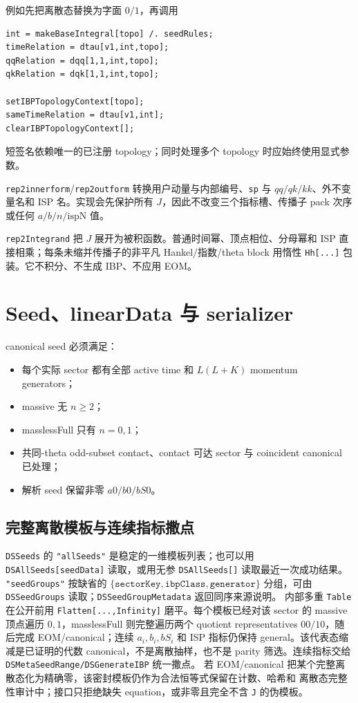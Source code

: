﻿\documentclass[a4paper,11pt]{article}
\begin{document}
例如先把离散态替换为字面 $0/1$，再调用
\begin{verbatim}
int = makeBaseIntegral[topo] /. seedRules;
timeRelation = dtau[v1,int,topo];
qqRelation = dqq[1,1,int,topo];
qkRelation = dqk[1,1,int,topo];

setIBPTopologyContext[topo];
sameTimeRelation = dtau[v1,int];
clearIBPTopologyContext[];
\end{verbatim}
短签名依赖唯一的已注册 topology；同时处理多个 topology 时应始终使用显式参数。

\texttt{rep2innerform}/\texttt{rep2outform} 转换用户动量与内部编号、\texttt{sp} 与 $qq/qk/kk$、外不变量名和 ISP 名。实现会先保护所有 $J$，因此不改变三个指标槽、传播子 pack 次序或任何 $a/b/n/\mathrm{ispN}$ 值。

\texttt{rep2Integrand} 把 $J$ 展开为被积函数。普通时间幂、顶点相位、分母幂和 ISP 直接相乘；每条未缩并传播子的非平凡 Hankel/指数/theta block 用惰性 \texttt{Hh[...]} 包装。它不积分、不生成 IBP、不应用 EOM。

\section{Seed、linearData 与 serializer}

canonical seed 必须满足：
\begin{itemize}
  \item 每个实际 sector 都有全部 active time 和 $L(L+K)$ momentum generators；
  \item massive 无 $n\ge2$；
  \item masslessFull 只有 $n=0,1$；
  \item 共同-theta odd-subset contact、contact 可达 sector 与 coincident canonical 已处理；
  \item 解析 seed 保留非零 $a0/b0/bS0$。
\end{itemize}

\subsection{完整离散模板与连续指标撒点}

\texttt{DSSeeds} 的 \texttt{"allSeeds"} 是稳定的一维模板列表；也可以用
\texttt{DSAllSeeds[seedData]} 读取，或用无参 \texttt{DSAllSeeds[]} 读取最近一次成功结果。
\texttt{"seedGroups"} 按缺省的 $\{\texttt{sectorKey},\texttt{ibpClass},\texttt{generator}\}$
分组，可由 \texttt{DSSeedGroups} 读取；\texttt{DSSeedGroupMetadata} 返回同序来源说明。
内部多重 \texttt{Table} 在公开前用 \texttt{Flatten[...,Infinity]} 磨平。每个模板已经对该
sector 的 massive 顶点遍历 $0,1$，masslessFull 则完整遍历两个 quotient representatives $00/10$，随后完成 EOM/canonical；连续 $a_i,b_i,bS_i$ 和 ISP 指标仍保持 general。该代表态缩减是已证明的代数 canonical，不是离散抽样，也不是 parity 筛选。连续指标交给
\texttt{DSMetaSeedRange/DSGenerateIBP} 统一撒点。
若 EOM/canonical 把某个完整离散态化为精确零，该密封模板仍作为合法恒等式保留在计数、哈希和
离散态完整性审计中；接口只拒绝缺失 equation，或非零且完全不含 \texttt{J} 的伪模板。
\end{document}
